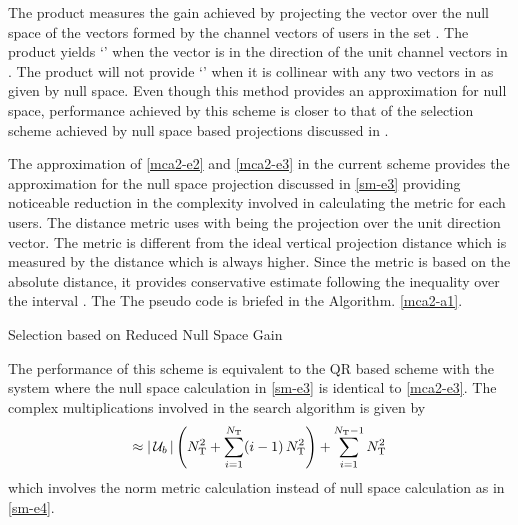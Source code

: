 The product measures the gain achieved by projecting the vector  over the null space of the vectors formed by the channel vectors of users in the set . The product yields `' when the vector  is in the direction of the unit channel vectors in . The product will not provide `' when it is collinear with any two vectors in  as given by null space. Even though this method provides an approximation for null space, performance achieved by this scheme is closer to that of the selection scheme achieved by null space based projections discussed in \cite{sus2006zfbf,antti_user_selection,icsps2010}.

The approximation of \eqref{mca2-e2} and \eqref{mca2-e3} in the current scheme provides the approximation for the null space projection discussed in \eqref{sm-e3} providing noticeable reduction in the complexity involved in calculating the metric for each users. The distance metric uses  with  being the projection over the unit direction vector. The metric is different from the ideal vertical projection distance which is measured by the distance which is always higher. Since the metric is based on the absolute distance, it provides conservative estimate following the inequality  over the interval . The  The pseudo code is briefed in the Algorithm. \ref{mca2-a1}.

\begin{algorithm}
 \SetAlgoLined
 \DontPrintSemicolon
 \caption{Selection based on Reduced Null Space Gain}
 \label{mca2-a1}
\end{algorithm}

The performance of this scheme is equivalent to the QR based scheme with the  system where the null space calculation in \eqref{sm-e3} is identical to \eqref{mca2-e3}. The complex multiplications involved in the search algorithm is given by
\begin{equation}
\approx | \, \mathcal{U}_b \, | \left ( N^2_{\mathrm{T}} + \sum^{N_{\mathrm{T}}}_{i = 1} (i - 1) \, N^2_{\mathrm{T}} \right ) + \sum^{N_{\mathrm{T}} - 1}_{i = 1} N^2_{\mathrm{T}}
\label{mca2-e4}
\end{equation}
which involves the norm metric calculation instead of null space calculation as in \eqref{sm-e4}.
